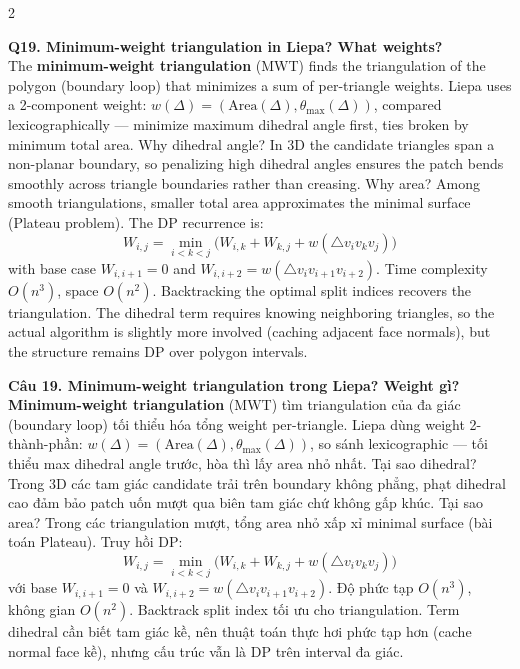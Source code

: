 \begin{paracol}{2}
\switchcolumn*

\textbf{Q19. Minimum-weight triangulation in Liepa? What weights?}\\
The \textbf{minimum-weight triangulation} (MWT) finds the triangulation of the polygon (boundary loop) that minimizes a sum of per-triangle weights. Liepa uses a 2-component weight: $w(\Delta) = (\mathrm{Area}(\Delta), \theta_{\max}(\Delta))$, compared lexicographically — minimize maximum dihedral angle first, ties broken by minimum total area. Why dihedral angle? In 3D the candidate triangles span a non-planar boundary, so penalizing high dihedral angles ensures the patch bends smoothly across triangle boundaries rather than creasing. Why area? Among smooth triangulations, smaller total area approximates the minimal surface (Plateau problem). The DP recurrence is:
\[
W_{i,j} = \min_{i<k<j} \Big(W_{i,k} + W_{k,j} + w(\triangle v_i v_k v_j)\Big)
\]
with base case $W_{i,i+1} = 0$ and $W_{i,i+2} = w(\triangle v_i v_{i+1} v_{i+2})$. Time complexity $O(n^3)$, space $O(n^2)$. Backtracking the optimal split indices recovers the triangulation. The dihedral term requires knowing neighboring triangles, so the actual algorithm is slightly more involved (caching adjacent face normals), but the structure remains DP over polygon intervals.

\switchcolumn

\textbf{Câu 19. Minimum-weight triangulation trong Liepa? Weight gì?}\\
\textbf{Minimum-weight triangulation} (MWT) tìm triangulation của đa giác (boundary loop) tối thiểu hóa tổng weight per-triangle. Liepa dùng weight 2-thành-phần: $w(\Delta) = (\mathrm{Area}(\Delta), \theta_{\max}(\Delta))$, so sánh lexicographic — tối thiểu max dihedral angle trước, hòa thì lấy area nhỏ nhất. Tại sao dihedral? Trong 3D các tam giác candidate trải trên boundary không phẳng, phạt dihedral cao đảm bảo patch uốn mượt qua biên tam giác chứ không gấp khúc. Tại sao area? Trong các triangulation mượt, tổng area nhỏ xấp xỉ minimal surface (bài toán Plateau). Truy hồi DP:
\[
W_{i,j} = \min_{i<k<j} \Big(W_{i,k} + W_{k,j} + w(\triangle v_i v_k v_j)\Big)
\]
với base $W_{i,i+1} = 0$ và $W_{i,i+2} = w(\triangle v_i v_{i+1} v_{i+2})$. Độ phức tạp $O(n^3)$, không gian $O(n^2)$. Backtrack split index tối ưu cho triangulation. Term dihedral cần biết tam giác kề, nên thuật toán thực hơi phức tạp hơn (cache normal face kề), nhưng cấu trúc vẫn là DP trên interval đa giác.

\switchcolumn*


\end{paracol}
